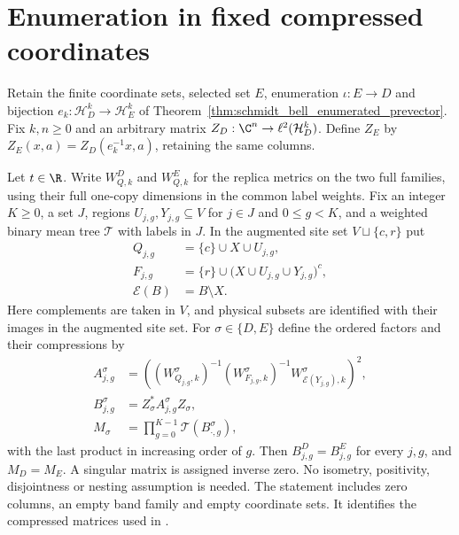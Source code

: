 \section{Enumeration in fixed compressed coordinates}

\begin{theorem}
    \label{thm:schmidt_bell_enumerated_band_product}
    \leanok
    Retain the finite coordinate sets, selected set $E$, enumeration
    $\iota:E\to D$ and bijection $e_k:\mathcal H_D^k\to\mathcal H_E^k$
    of Theorem~\ref{thm:schmidt_bell_enumerated_prevector}.
    Fix $k,n\geq0$ and an arbitrary matrix
    $Z_D:\C^n\to\ell^2(\mathcal H_D^k)$. Define $Z_E$ by
    $Z_E(x,a)=Z_D(e_k^{-1}x,a)$, retaining the same columns.

    Let $t\in\R$. Write $W^D_{Q,k}$ and $W^E_{Q,k}$ for the replica
    metrics on the two full families, using their full one-copy dimensions
    in the common label weights. Fix an integer $K\geq0$, a set $J$,
    regions $U_{j,g},Y_{j,g}\subseteq V$ for $j\in J$ and $0\leq g<K$,
    and a weighted binary mean tree $\mathcal T$ with labels in $J$.
    In the augmented site set $V\sqcup\{c,r\}$ put
    \begin{align*}
        Q_{j,g} & = \{c\}\cup X\cup U_{j,g},\\
        F_{j,g} & = \{r\}\cup\bigl(X\cup U_{j,g}\cup Y_{j,g}\bigr)^c,\\
        \mathcal E(B) & = B\setminus X.
    \end{align*}
    Here complements are taken in $V$, and physical subsets are identified
    with their images in the augmented site set. For $\sigma\in\{D,E\}$
    define the ordered factors and their compressions by
    \begin{align*}
        A^\sigma_{j,g} & =
        \left((W^\sigma_{Q_{j,g},k})^{-1}
        (W^\sigma_{F_{j,g},k})^{-1}
        W^\sigma_{\mathcal E(Y_{j,g}),k}\right)^2,\\
        B^\sigma_{j,g} & = Z_\sigma^*A^\sigma_{j,g}Z_\sigma,\\
        M_\sigma & = \prod_{g=0}^{K-1}\mathcal T(B^\sigma_{\cdot,g}),
    \end{align*}
    with the last product in increasing order of $g$. Then
    $B^D_{j,g}=B^E_{j,g}$ for every $j,g$, and $M_D=M_E$.
    A singular matrix is assigned inverse zero.
    No isometry, positivity, disjointness or nesting assumption is needed.
    The statement includes zero columns, an empty band family and empty
    coordinate sets. It identifies the compressed matrices used in
    \cite[Section~8, lines~80--110, 283--308 and~370--381]{OpenAI2026AreaLaw}.
\end{theorem}
